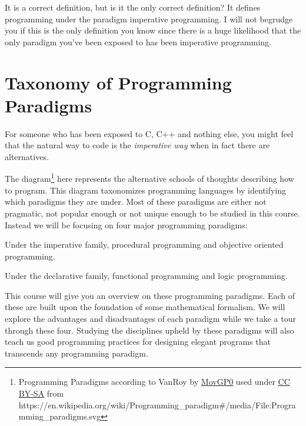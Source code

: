 It is a correct definition, but is it the only correct definition? It
defines programming under the paradigm imperative programming. I will
not begrudge you if this is the only definition you know since there is
a huge likelihood that the only paradigm you've been exposed to has been
imperative programming.

\section{Taxonomy of Programming
Paradigms}\label{programming-paradigms-introduction.md__taxonomy-of-programming-paradigms}

For someone who has been exposed to C, C++ and nothing else, you might
feel that the natural way to code is the \emph{imperative way} when in
fact there are alternatives.

The diagram\footnote{Programming Paradigms according to VanRoy by
  \href{https://commons.wikimedia.org/wiki/User:MovGP0}{MovGP0} used
  under \href{https://creativecommons.org/licenses/by-sa/4.0/}{CC BY-SA}
  from
  https://en.wikipedia.org/wiki/Programming\_paradigm\#/media/File:Programming\_paradigms.svg}
here represents the alternative schools of thoughts describing how to
program. This diagram taxonomizes programming languages by identifying
which paradigms they are under. Most of these paradigms are either not
pragmatic, not popular enough or not unique enough to be studied in this
course. Instead we will be focusing on four major programming paradigms:

\begin{Shaded}
\begin{Highlighting}[]
\end{Highlighting}
\end{Shaded}

Under the imperative family, procedural programming and objective
oriented programming.

Under the declarative family, functional programming and logic
programming.

This course will give you an overview on these programming paradigms.
Each of these are built upon the foundation of some mathematical
formalism. We will explore the advantages and disadvantages of each
paradigm while we take a tour through these four. Studying the
disciplines upheld by these paradigms will also teach us good
programming practices for designing elegant programs that transcends any
programming paradigm.


